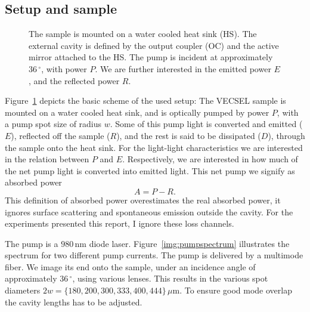 \subsection{Setup and sample}
\label{sec:exp:setup}

\begin{figure}
\centering
\caption{The sample is mounted on a
water cooled heat sink (HS).
The external cavity is defined by the output coupler (OC)
and the active mirror
attached to the HS.
The pump is incident at
approximately $36\,^\circ$, with power $P$.
We are further interested in
the emitted power $E$,
and the reflected power $R$.}
\label{img:setup_sketch}
\end{figure}

Figure~\ref{img:setup_sketch} depicts
the basic scheme of the used setup:
The VECSEL sample is mounted
on a water cooled heat sink,
and is optically pumped by power $P$,
with a pump spot size
of radius $w$.
Some of this pump light is
converted and emitted ($E$),
reflected off the sample ($R$),
and the rest is said to be dissipated ($D$),
through the sample
onto the heat sink.
For the light-light characteristics
we are interested
in the relation between $P$ and $E$.
Respectively,
we are interested in
how much of the net pump light
is converted into emitted light.
This net pump we signify as
absorbed power
\begin{equation}
A = P-R.
\label{eq:abspwr}
\end{equation}
This definition
of absorbed power
overestimates
the real absorbed power,
it ignores
surface scattering and
spontaneous emission outside the cavity.
For the experiments
presented this report,
I ignore these loss channels.

The pump is a $980\,\mathrm{nm}$ diode laser.
Figure~\ref{img:pumpspectrum} illustrates the spectrum
for two different pump currents.
The pump is delivered by a multimode fiber.
We image its end onto the sample,
under an incidence angle
of approximately $36\,^\circ$,
using various lenses.
This results in
the various spot diameters
$2w=\{180,200,300,333,400,444\}\,\mu\mathrm{m}$.
To ensure good mode overlap
the cavity lengths has to be adjusted.

